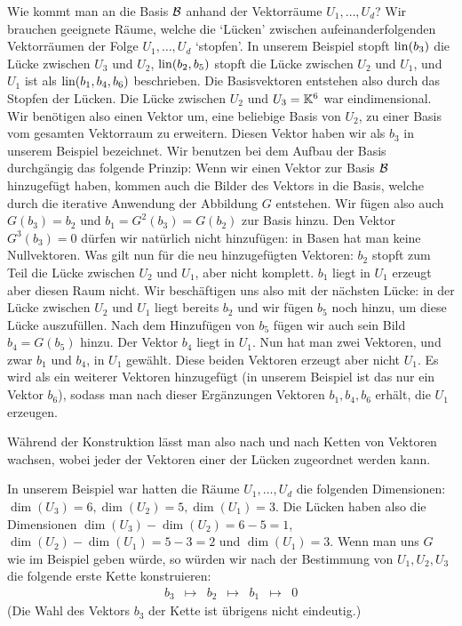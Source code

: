 \begin{bsp}
	Wie kommt man an die Basis $\mathcal{B}$ anhand der Vektorräume $U_1,\ldots,U_d$? Wir brauchen geeignete Räume, welche die `Lücken' zwischen aufeinanderfolgenden Vektorräumen der Folge $U_1,\ldots,U_d$ `stopfen'. 
	In unserem Beispiel stopft $\operatorname{lin}(b_3)$ die Lücke zwischen $U_3$ und $U_2$, $\operatorname{lin}(b_2,b_5)$ stopft die Lücke zwischen $U_2$ und $U_1$, und $U_1$ ist als $\operatorname{lin}(b_1,b_4,b_6)$ beschrieben. Die Basisvektoren entstehen also durch das Stopfen der Lücken. Die Lücke zwischen $U_2$ und $U_3= \mathbb K^6$ war eindimensional. Wir benötigen also einen Vektor um, eine beliebige Basis von $U_2$, zu einer Basis vom gesamten Vektorraum zu erweitern. Diesen Vektor haben wir als $b_3$ in unserem Beispiel bezeichnet. Wir benutzen bei dem Aufbau der Basis durchgängig das folgende Prinzip: Wenn wir einen Vektor zur Basis $\mathcal{B}$ hinzugefügt haben, kommen auch  die Bilder des Vektors in die Basis, welche durch die iterative Anwendung der Abbildung $G$ entstehen. Wir fügen also auch $G(b_3) = b_2$ und $b_1 = G^2(b_3) = G (b_2)$ zur Basis hinzu. Den Vektor $G^3(b_3) =0$ dürfen wir natürlich nicht hinzufügen: in Basen hat man keine Nullvektoren. Was gilt nun für die neu hinzugefügten Vektoren: $b_2$ stopft zum Teil die Lücke zwischen $U_2$ und $U_1$, aber nicht komplett. $b_1$ liegt in $U_1$ erzeugt aber diesen Raum nicht. Wir beschäftigen uns also mit der nächsten Lücke: in der Lücke zwischen $U_2$ und $U_1$ liegt bereits $b_2$ und wir fügen $b_5$ noch hinzu, um diese Lücke auszufüllen. Nach dem Hinzufügen von $b_5$ fügen wir auch sein Bild $b_4 = G(b_5)$ hinzu. Der Vektor $b_4$ liegt in $U_1$. Nun hat man zwei Vektoren, und zwar $b_1$ und $b_4$, in $U_1$ gewählt. Diese beiden Vektoren erzeugt aber nicht $U_1$. Es wird als ein weiterer Vektoren hinzugefügt (in unserem Beispiel ist das nur ein Vektor $b_6$),  sodass man nach dieser Ergänzungen Vektoren $b_1, b_4, b_6$ erhält, die $U_1$ erzeugen. 
	
	Während der Konstruktion lässt man also nach und  nach Ketten von Vektoren wachsen, wobei jeder der Vektoren einer der Lücken zugeordnet werden kann. 
	
	In unserem Beispiel war hatten die Räume $U_1,\ldots,U_d$ die folgenden Dimensionen: $\dim(U_3) = 6, \dim(U_2) = 5, \dim (U_1) = 3$. Die Lücken haben also die Dimensionen $\dim(U_3) -\dim(U_2) = 6-5=1$, $\dim(U_2) -\dim(U_1) =  5-3=2$ und $\dim(U_1) = 3$. Wenn man uns $G$ wie im Beispiel geben würde, so würden wir nach der Bestimmung von $U_1,U_2,U_3$ die folgende erste Kette konstruieren: 
	\begin{equation*}
\begin{array}{ccccccc}
b_3 & \mapsto & b_2 & \mapsto & b_1 & \mapsto & 0
\end{array}
\end{equation*}
	(Die Wahl des Vektors $b_3$ der Kette ist übrigens nicht eindeutig.)
	

\end{bsp}
